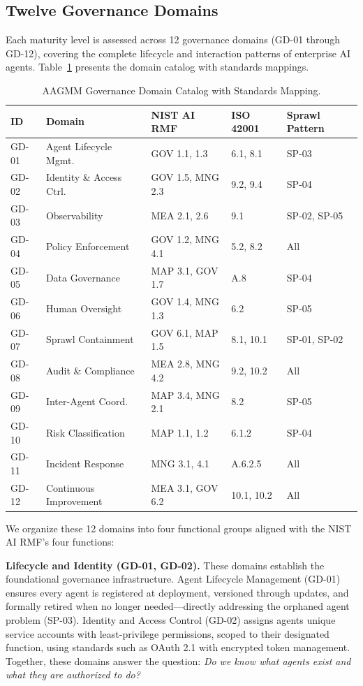 \documentclass[ai,article,submit,pdftex,moreauthors]{Definitions/mdpi}
\begin{document}
\subsection{Twelve Governance Domains}\label{sec:framework-domains}

Each maturity level is assessed across 12 governance domains (GD-01 through GD-12), covering the complete lifecycle and interaction patterns of enterprise AI agents. Table~\ref{tab:domains} presents the domain catalog with standards mappings.

\begin{table}[htbp]
\caption{AAGMM Governance Domain Catalog with Standards Mapping.}\label{tab:domains}
\centering
\small
\begin{tabularx}{\textwidth}{l l l l X}
\toprule
\textbf{ID} & \textbf{Domain} & \textbf{NIST AI RMF} & \textbf{ISO 42001} & \textbf{Sprawl Pattern} \\
\midrule
GD-01 & Agent Lifecycle Mgmt. & GOV 1.1, 1.3 & 6.1, 8.1 & SP-03 \\
GD-02 & Identity \& Access Ctrl. & GOV 1.5, MNG 2.3 & 9.2, 9.4 & SP-04 \\
GD-03 & Observability & MEA 2.1, 2.6 & 9.1 & SP-02, SP-05 \\
GD-04 & Policy Enforcement & GOV 1.2, MNG 4.1 & 5.2, 8.2 & All \\
GD-05 & Data Governance & MAP 3.1, GOV 1.7 & A.8 & SP-04 \\
GD-06 & Human Oversight & GOV 1.4, MNG 1.3 & 6.2 & SP-05 \\
GD-07 & Sprawl Containment & GOV 6.1, MAP 1.5 & 8.1, 10.1 & SP-01, SP-02 \\
GD-08 & Audit \& Compliance & MEA 2.8, MNG 4.2 & 9.2, 10.2 & All \\
GD-09 & Inter-Agent Coord. & MAP 3.4, MNG 2.1 & 8.2 & SP-05 \\
GD-10 & Risk Classification & MAP 1.1, 1.2 & 6.1.2 & SP-04 \\
GD-11 & Incident Response & MNG 3.1, 4.1 & A.6.2.5 & All \\
GD-12 & Continuous Improvement & MEA 3.1, GOV 6.2 & 10.1, 10.2 & All \\
\bottomrule
\end{tabularx}
\end{table}

We organize these 12 domains into four functional groups aligned with the NIST AI RMF's four functions:

\textbf{Lifecycle and Identity (GD-01, GD-02).} These domains establish the foundational governance infrastructure. Agent Lifecycle Management (GD-01) ensures every agent is registered at deployment, versioned through updates, and formally retired when no longer needed---directly addressing the orphaned agent problem (SP-03). Identity and Access Control (GD-02) assigns agents unique service accounts with least-privilege permissions, scoped to their designated function, using standards such as OAuth 2.1 with encrypted token management. Together, these domains answer the question: \textit{Do we know what agents exist and what they are authorized to do?}
\end{document}
